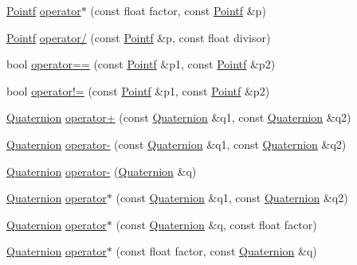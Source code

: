 \begin{DoxyCompactItemize}
\item 
\hyperlink{classprism_1_1_pointf}{Pointf} \hyperlink{namespaceprism_a409aa6b61b79f029d78f6d4c3aba2df5}{operator$\ast$} (const float factor, const \hyperlink{classprism_1_1_pointf}{Pointf} \&p)
\item 
\hyperlink{classprism_1_1_pointf}{Pointf} \hyperlink{namespaceprism_a71504f6dd299e8bc788e07d11d29dc5e}{operator/} (const \hyperlink{classprism_1_1_pointf}{Pointf} \&p, const float divisor)
\item 
bool \hyperlink{namespaceprism_a13ab889958edc08eea9a5bea056cd9c1}{operator==} (const \hyperlink{classprism_1_1_pointf}{Pointf} \&p1, const \hyperlink{classprism_1_1_pointf}{Pointf} \&p2)
\item 
bool \hyperlink{namespaceprism_ae010d5880eb7bcf5119f006e26bf473f}{operator!=} (const \hyperlink{classprism_1_1_pointf}{Pointf} \&p1, const \hyperlink{classprism_1_1_pointf}{Pointf} \&p2)
\item 
\hyperlink{classprism_1_1_quaternion}{Quaternion} \hyperlink{namespaceprism_ad81bceaddc25922e571b4bf427ffe296}{operator+} (const \hyperlink{classprism_1_1_quaternion}{Quaternion} \&q1, const \hyperlink{classprism_1_1_quaternion}{Quaternion} \&q2)
\item 
\hyperlink{classprism_1_1_quaternion}{Quaternion} \hyperlink{namespaceprism_a5eae37b5dc73c544572686f215cea89d}{operator-\/} (const \hyperlink{classprism_1_1_quaternion}{Quaternion} \&q1, const \hyperlink{classprism_1_1_quaternion}{Quaternion} \&q2)
\item 
\hyperlink{classprism_1_1_quaternion}{Quaternion} \hyperlink{namespaceprism_ae04c2e5eae2242c58a967086ecad8ff4}{operator-\/} (\hyperlink{classprism_1_1_quaternion}{Quaternion} \&q)
\item 
\hyperlink{classprism_1_1_quaternion}{Quaternion} \hyperlink{namespaceprism_a74c3eeec91c3a178711b6f05a5487d70}{operator$\ast$} (const \hyperlink{classprism_1_1_quaternion}{Quaternion} \&q1, const \hyperlink{classprism_1_1_quaternion}{Quaternion} \&q2)
\item 
\hyperlink{classprism_1_1_quaternion}{Quaternion} \hyperlink{namespaceprism_a45806b1a58ec5aae0db87d399d4d832b}{operator$\ast$} (const \hyperlink{classprism_1_1_quaternion}{Quaternion} \&q, const float factor)
\item 
\hyperlink{classprism_1_1_quaternion}{Quaternion} \hyperlink{namespaceprism_ad9f03413053b1efa6851344eb39a5982}{operator$\ast$} (const float factor, const \hyperlink{classprism_1_1_quaternion}{Quaternion} \&q)
\item 

\end{DoxyCompactItemize}
